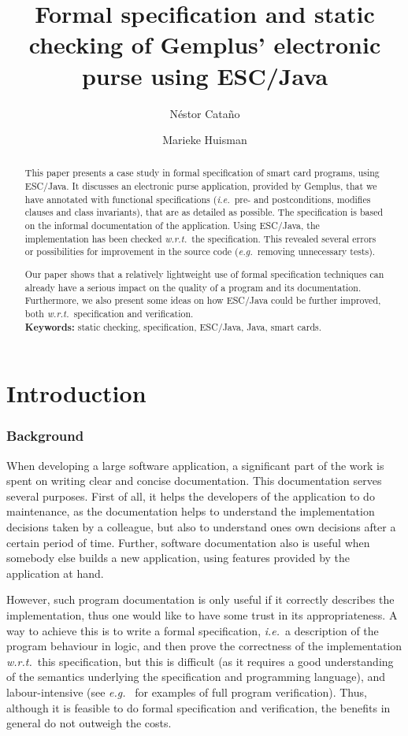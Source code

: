 \documentclass[a4paper]{llncs}
\title{Formal specification and static checking of Gemplus' electronic
purse using ESC/Java}
\author{
  N\'estor Cata\~no
\and
  Marieke Huisman
}
\institute{
  INRIA Sophia-Antipolis, France \\ 
  \email{\{Nestor.Catano, Marieke.Huisman\}@sophia.inria.fr}
}
\begin{document}
%

\maketitle


\begin{abstract}
This paper presents a case study in formal specification of smart card
programs, using ESC/Java. It discusses an electronic purse
application, provided by Gemplus, that we have annotated with
functional specifications (\emph{i.e.}~pre- and postconditions,
modifies clauses and class invariants), that are as detailed as
possible. The specification is based on the informal documentation of
the application. Using ESC/Java, the implementation has been checked
\emph{w.r.t.}~the specification.  This revealed several errors or
possibilities for improvement in the source code (\emph{e.g.}~removing
unnecessary tests).

Our paper shows that a relatively
lightweight use of formal specification techniques can already have
a serious impact on the quality of a program and its
documentation. Furthermore, we also present some ideas on how ESC/Java
could be further improved, both
\emph{w.r.t.}~specification and verification.
\\
\textbf{Keywords:} static checking, specification, ESC/Java, Java, smart cards.
\end{abstract}

\section{Introduction}
\label{SectIntro}

\subsubsection{Background}
When developing a large software application, a significant part of
the work is spent on writing clear and concise documentation. This
documentation serves several purposes. First of all, it helps the
developers of the application to do maintenance, as the documentation
helps to understand the implementation decisions taken by a colleague,
but also to understand ones own decisions after a certain period of
time. Further, software documentation also is useful when somebody
else builds a new application, using features provided by the
application at hand.

However, such program documentation is only useful if it correctly
describes the implementation, thus one would like to have some trust
in its appropriateness. A way to achieve this is to write a formal
specification, \emph{i.e.}~a description of the program behaviour in
logic, and then prove the correctness of the implementation
\emph{w.r.t.}~this specification, but this is difficult (as it
requires a good understanding of the semantics underlying the
specification and programming language), and labour-intensive (see
\emph{e.g.}~\cite{HuismanJB01,BreunesseJB02} for examples of full program
verification). Thus, although it is feasible to do formal
specification and verification, the benefits in general do not outweigh
the costs.
\end{document}
